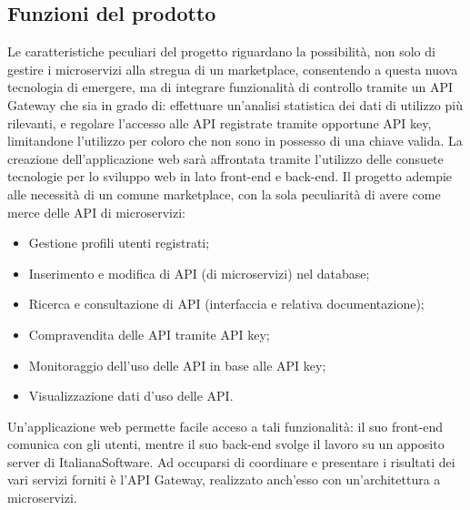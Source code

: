 \subsection{Funzioni del prodotto}
Le caratteristiche peculiari del progetto riguardano la possibilità, non solo di gestire i microservizi alla stregua di un marketplace, consentendo a questa nuova tecnologia di emergere, ma di integrare funzionalità di controllo tramite un API Gateway che sia in grado di: effettuare un'analisi statistica dei dati di utilizzo più rilevanti, e regolare l'accesso alle API registrate tramite opportune API key, limitandone l'utilizzo per coloro che non sono in possesso di una chiave valida. La creazione dell'applicazione web sarà affrontata tramite l'utilizzo delle consuete tecnologie per lo sviluppo web in lato front-end e back-end. Il progetto adempie alle necessità di un comune marketplace, con la sola peculiarità di avere come merce delle API di microservizi:
\begin{itemize}
\item Gestione profili utenti registrati;
\item Inserimento e modifica di API (di microservizi) nel database;
\item Ricerca e consultazione di API (interfaccia e relativa documentazione);
\item Compravendita delle API tramite API key;
\item Monitoraggio dell'uso delle API in base alle API key;
\item Visualizzazione dati d'uso delle API.
\end{itemize}
Un'applicazione web permette facile acceso a tali funzionalità: il suo front-end comunica con gli utenti, mentre il suo back-end svolge il lavoro su un apposito server di ItalianaSoftware. Ad occuparsi di coordinare e presentare i risultati dei vari servizi forniti è l'API Gateway, realizzato anch'esso con un'architettura a microservizi.

